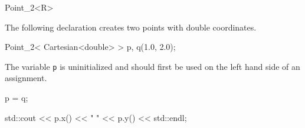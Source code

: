 \begin{ccRefClass} {Point_2<R>}
\ccExample

The following declaration creates two points with  double coordinates.

\begin{cprog}

  Point_2< Cartesian<double> > p, q(1.0, 2.0);
\end{cprog} 

The variable {\tt p} is uninitialized and should first be used on 
the left hand side of an assignment. 
\begin{cprog}

  p = q;

  std::cout << p.x() << "  " << p.y() << std::endl; 
\end{cprog} 


\ccSeeAlso
{}

\end{ccRefClass} 
